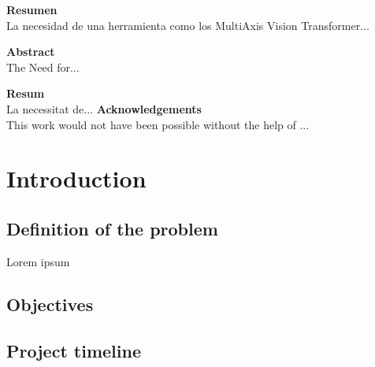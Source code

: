 \documentclass[a4paper,10pt]{book}
\begin{document}
\newpage
{}
\textbf{\large Resumen} \\

La necesidad de una herramienta como los MultiAxis Vision Transformer...

\newpage
{}
\textbf{\large Abstract} \\

The Need for...

\newpage
{}
\textbf{\large Resum} \\

La necessitat de...
\newpage
{}
\textbf{\large Acknowledgements} \\

This work would not have been possible without the help of ...
 \setcounter{page}{0}
\let\cleardoublepage\clearpage
\tableofcontents
\newpage \thispagestyle{empty}

\pagestyle{fancy}
\newpage \thispagestyle{empty}
\mainmatter
\chapter{Introduction}
\section{Definition of the problem}

Lorem ipsum 

\newpage

\section{Objectives}

\section{Project timeline}
\end{document}
